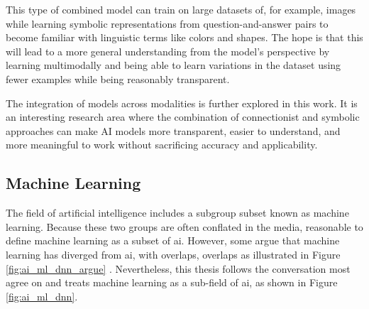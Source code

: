     This type of combined model can train on large datasets of, for example, images while learning symbolic representations from question-and-answer pairs to become familiar with linguistic terms like colors and shapes. The hope is that this will lead to a more general understanding from the model's perspective by learning multimodally and being able to learn variations in the dataset using fewer examples while being reasonably transparent.
    
    The integration of models across modalities is further explored in this work. It is an interesting research area where the combination of connectionist and symbolic approaches can make AI models more transparent, easier to understand, and more meaningful to work without sacrificing accuracy and applicability.


    \subsection{Machine Learning}

    The field of artificial intelligence includes a subgroup subset known as machine learning. Because these two groups are often conflated in the media, reasonable to define machine learning as a subset of \gls{ai}. However, some argue that machine learning has diverged from \gls{ai}, with overlaps, overlaps as illustrated in Figure \ref{fig:ai_ml_dnn_argue} \cite{raschkaChapterIntroductionMachine2020}. Nevertheless, this thesis follows the conversation most agree on and treats machine learning as a sub-field of \gls{ai}, as shown in Figure \ref{fig:ai_ml_dnn}.


